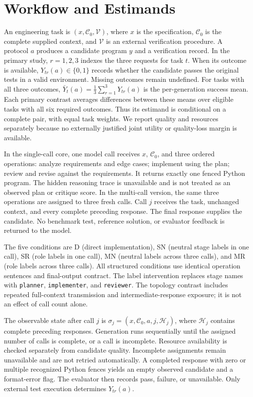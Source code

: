 \section{Workflow and Estimands}
An engineering task is $(x,\mathcal{C}_0,\mathcal{V})$, where $x$ is the specification, $\mathcal{C}_0$ is the complete supplied context, and $\mathcal{V}$ is an external verification procedure. A protocol $a$ produces a candidate program $y$ and a verification record. In the primary study, $r=1,2,3$ indexes the three requests for task $t$. When its outcome is available, $Y_{tr}(a)\in\{0,1\}$ records whether the candidate passes the original tests in a valid environment. Missing outcomes remain undefined. For tasks with all three outcomes, $\bar Y_t(a)=\frac{1}{3}\sum_{r=1}^{3}Y_{tr}(a)$ is the per-generation success mean. Each primary contrast averages differences between these means over eligible tasks with all six required outcomes. Thus its estimand is conditional on a complete pair, with equal task weights. We report quality and resources separately because no externally justified joint utility or quality-loss margin is available.

In the single-call core, one model call receives $x$, $\mathcal{C}_0$, and three ordered operations: analyze requirements and edge cases; implement using the plan; review and revise against the requirements. It returns exactly one fenced Python program. The hidden reasoning trace is unavailable and is not treated as an observed plan or critique score. In the multi-call version, the same three operations are assigned to three fresh calls. Call $j$ receives the task, unchanged context, and every complete preceding response. The final response supplies the candidate. No benchmark test, reference solution, or evaluator feedback is returned to the model.

The five conditions are D (direct implementation), SN (neutral stage labels in one call), SR (role labels in one call), MN (neutral labels across three calls), and MR (role labels across three calls). All structured conditions use identical operation sentences and final-output contract. The label intervention replaces stage names with \texttt{planner}, \texttt{implementer}, and \texttt{reviewer}. The topology contrast includes repeated full-context transmission and intermediate-response exposure; it is not an effect of call count alone.

The observable state after call $j$ is $\sigma_j=(x,\mathcal{C}_0,a,j,\mathcal{H}_j)$, where $\mathcal{H}_j$ contains complete preceding responses. Generation runs sequentially until the assigned number of calls is complete, or a call is incomplete. Resource availability is checked separately from candidate quality. Incomplete assignments remain unavailable and are not retried automatically. A completed response with zero or multiple recognized Python fences yields an empty observed candidate and a format-error flag. The evaluator then records pass, failure, or unavailable. Only external test execution determines $Y_{tr}(a)$.

